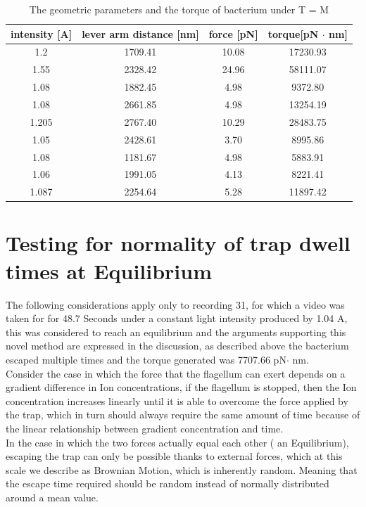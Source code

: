 \documentclass[a4paper,english,12pt,bibliography=totoc]{scrreprt}
\begin{document}
\begin{table}[H]
    \centering
    \begin{tabular}{|c|c|c|c|}
    \hline
intensity [A] & lever arm distance [nm] & force [pN] & torque[pN $\cdot$ nm]\\
            \hline
             1.2&1709.41 &10.08 & 17230.93\\
             \hline
             1.55&2328.42 &24.96 &58111.07\\
             \hline
             1.08&1882.45 &4.98 &9372.80\\
             \hline
             1.08&2661.85 &4.98 &13254.19\\
             \hline
             1.205&2767.40 &10.29 &28483.75\\
             \hline
             1.05&2428.61 &3.70 &8995.86\\
             \hline
             1.08&1181.67 &4.98 &5883.91\\
             \hline
             1.06&1991.05 &4.13 &8221.41\\
             \hline
             1.087&2254.64 &5.28 &11897.42\\
             \hline
    \end{tabular}
    \caption{The geometric parameters and the torque of bacterium under T = M}
    \label{tab:my_label}
\end{table}

\section{ Testing for normality of trap dwell times at Equilibrium}

The following considerations apply only to recording 31, for which a video was taken for for 48.7 Seconds under a constant light intensity produced by 1.04 A, this was considered to reach an equilibrium and the arguments supporting this novel method are expressed in the discussion, as described above the bacterium escaped multiple times and the torque generated was 7707.66 pN$\cdot$ nm. \\

Consider the case in which the force that the flagellum can exert depends on a gradient difference in Ion concentrations, if the flagellum is stopped, then the Ion concentration  increases linearly until it is able to overcome the force applied by the trap, which in turn should always require the same amount of time because of the linear relationship between gradient concentration and time. \cite{biquet-bisquert_dynamic_2021} \\
In the case in which the two forces actually equal each other ( an Equilibrium), escaping the trap can only be possible thanks to external forces, which at this scale we describe as Brownian Motion, which is inherently random. Meaning that the escape time required should be random instead of normally distributed around a mean value.
\end{document}
